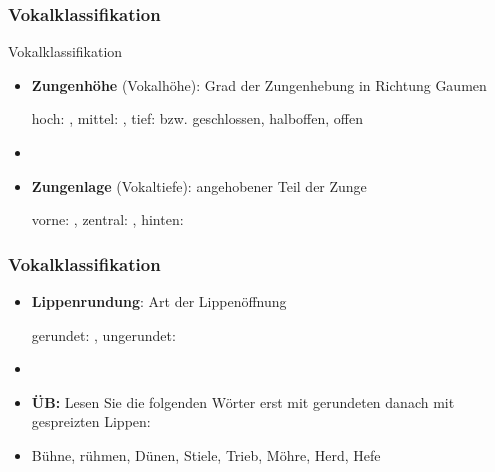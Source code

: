 %
\subsubsection{Vokalklassifikation}
%

\begin{frame}{Vokalklassifikation}

	\begin{itemize}
		\item \textbf{Zungenhöhe} (Vokalhöhe): Grad der Zungenhebung in Richtung Gaumen

		\ea hoch: \textipa{[ i: ]}, mittel: \textipa{[ o: ]}, tief: \textipa{[ a: ]} bzw. geschlossen, halboffen, offen
		\z

		\item[]
		\item \textbf{Zungenlage} (Vokaltiefe): angehobener Teil der Zunge

		\ea vorne: \textipa{[ i: ]}, zentral: \textipa{[ a: ]}, hinten: \textipa{[ u: ]}
		\z

	\end{itemize}
	
\end{frame}



\begin{frame}
\frametitle{Vokalklassifikation}

	\begin{itemize}
		\item \textbf{Lippenrundung}: Art der Lippenöffnung

		\ea gerundet: \textipa{[ o: ]}, ungerundet: \textipa{[ i: ]}
		\z

		\item[]
		\item\textbf{ÜB:} Lesen Sie die folgenden Wörter erst mit gerundeten danach mit gespreizten Lippen:
		\item[] Bühne, rühmen, Dünen, Stiele, Trieb, Möhre, Herd, Hefe
	\end{itemize}
	
\end{frame}



